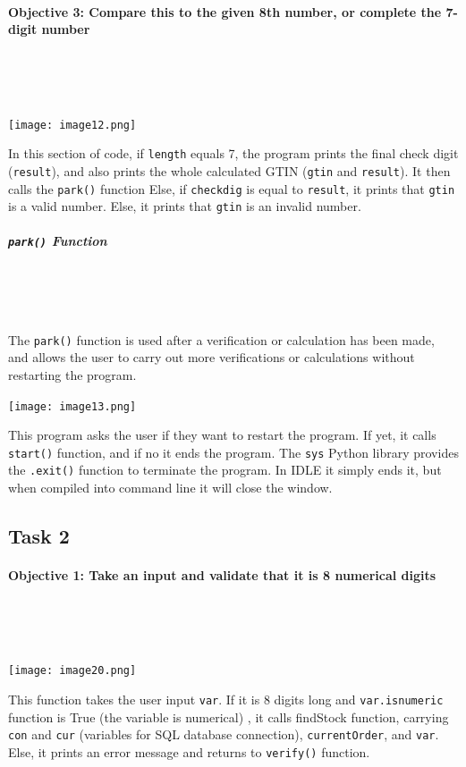 \documentclass[a4paper]{article}
\begin{document}
\paragraph{Objective 3: Compare this to the given 8th number, or complete the 7-digit number} ~\par ~\par
\noindent\texttt{[image: image12.png]} ~\par
In this section of code, if \verb?length? equals 7, the program prints the final check digit (\verb?result?), and also prints the whole calculated GTIN (\verb?gtin? and \verb?result?). It then calls the \verb|park()| function
Else, if \verb?checkdig? is equal to \verb?result?, it prints that \verb?gtin? is a valid number. Else, it prints that \verb?gtin? is an invalid number.
\subparagraph{\texttt{park()} Function} ~ \par ~ \par
The \verb|park()| function is used after a verification or calculation has been made, and allows the user to carry out more verifications or calculations without restarting the program. \par
\noindent\texttt{[image: image13.png]} \par
This program asks the user if they want to restart the program. If yet, it calls \verb|start()| function, and if no it ends the program. The \verb|sys| Python library provides the \verb|.exit()| function to terminate the program. In IDLE it simply ends it, but when compiled into command line it will close the window.


\newpage
\subsection{Task 2}
\paragraph{Objective 1: Take an input and validate that it is 8 numerical digits} ~\par ~\par
\noindent\texttt{[image: image20.png]} ~\par
This function takes the user input \verb?var?. If it is 8 digits long and \verb|var.isnumeric| function is True (the variable is numerical) , it calls findStock function, carrying \verb?con? and \verb?cur? (variables for SQL database connection), \verb?currentOrder?, and \verb?var?. Else, it prints an error message and returns to \verb|verify()| function.
\end{document}
